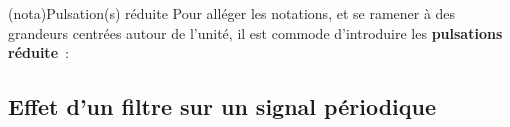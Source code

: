 \documentclass[../../main/main.tex]{subfiles}
\begin{document}
\begin{tcb*}(nota){Pulsation(s) réduite}
	Pour alléger les notations, et se ramener à des grandeurs centrées autour de
	l'unité, il est commode d'introduire les \textbf{pulsations réduite}~:
	\psw{%
		\[
			x = \frac{\w}{\w\ind{ref}}
			\qav
			\w\ind{ref} = \w_c
			\qou
			\w\ind{ref} = \w_0
			\quad \text{selon le contexte}
		\]
	}%
	\vspace{-15pt}
\end{tcb*}

\subsection{Effet d'un filtre sur un signal périodique}

\end{document}
